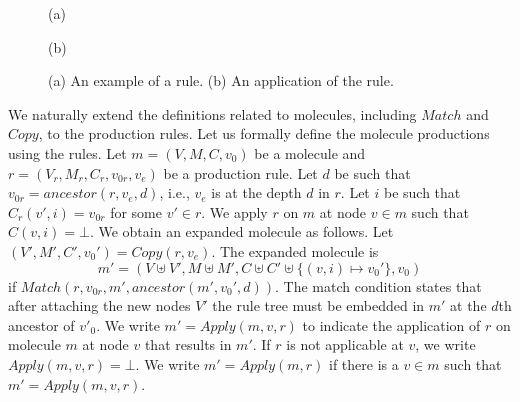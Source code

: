\begin{figure}[t]
  \begin{minipage}{0.48\linewidth}
    \center
  \par
  (a)
  \end{minipage}
  \begin{minipage}{0.48\linewidth}
        \center
  \par
  (b)
  \end{minipage}

  \caption{(a) An example of a rule. (b) An application of the rule.}
  \label{fig:exrule}
\end{figure}

We naturally extend the definitions related to molecules, including $Match$ and $Copy$,
to the production rules.
Let us formally define the molecule productions using the rules.
Let $m = (V,M,C,v_0)$ be a molecule and $r = (V_r, M_r, C_r, v_{0r}, v_e)$ be a production rule.
Let $d$ be such that $v_{0r} = ancestor(r,v_e,d)$, i.e., $v_e$ is at the depth $d$ in $r$.
Let $i$ be such that $C_r(v',i) = v_{0r}$ for some $v' \in r$.
We apply $r$ on $m$ at node $v \in m$ such that $C(v,i) = \bot$.
We obtain an expanded molecule as follows.
Let $(V',M',C',v_0') = Copy(r,v_e)$.
The expanded molecule is
$$
m' = (V \uplus V', M \uplus M', C \uplus C' \uplus \{(v,i) \mapsto v_0'\}, v_0)
$$ if
$Match( r, v_{0r}, m', ancestor(m', v_0', d) )$.
The match condition states that after attaching the new nodes $V'$
the rule tree must be embedded in $m'$ at the $d$th ancestor of $v'_0$. 
We write $m' = Apply(m, v, r)$ to indicate the application of $r$
on molecule $m$ at node $v$ that results in $m'$.
If $r$ is not applicable at $v$, we write $Apply(m, v, r) = \bot$.
We write $m' = Apply(m, r)$ if there is a $v \in m$ such that
$m' = Apply(m,v,r)$.

